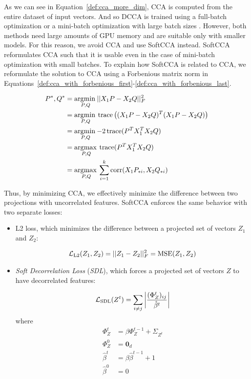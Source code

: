 As we can see in Equation~\ref{def:cca_more_dim}, CCA is computed from the
entire dataset of input vectors. And so DCCA is trained using a full-batch
optimization \citep{andrew2013deep} or a mini-batch optimization with large
batch sizes \citep{wang2015unsupervised}. However, both methods need large
amounts of GPU memory and are suitable only with smaller models. For this
reason, we avoid CCA and use SoftCCA \citep{chang2018scalable} instead. SoftCCA
reformulates CCA such that it is usable even in the case of mini-batch
optimization with small batches. To explain how SoftCCA is related to CCA, we
reformulate the solution to CCA using a Forbenious matrix norm in
Equations~\ref{def:cca_with_forbenious_first}-\ref{def:cca_with_forbenious_last}.

\begin{align}
  P^\ast, Q^\ast &= \underset{P, Q}{\operatorname*{\arg\!\min\medspace}} ||X_1P - X_2Q||^2_F \label{def:cca_with_forbenious_first} \\
  &= \underset{P, Q}{\operatorname*{\arg\!\min\medspace}} \operatorname*{trace}\left((X_1P - X_2Q)^T(X_1P - X_2Q)\right) \\
  &= \underset{P, Q}{\operatorname*{\arg\!\min\medspace}} {-2} \operatorname*{trace}(P^TX_1^TX_2Q) \\
  &= \underset{P, Q}{\operatorname*{\arg\!\max\medspace}} \operatorname*{trace}(P^TX_1^TX_2Q) \\
  &= \underset{P, Q}{\operatorname*{\arg\!\max\medspace}} \sum_{i = 1}^k \operatorname*{corr}(X_1P_{*i}, X_2Q_{*i}) \label{def:cca_with_forbenious_last}
\end{align}

Thus, by minimizing CCA, we effectively minimize the difference between two
projections with uncorrelated features. SoftCCA enforces the same behavior
with two separate losses:

\begin{itemize}

  \item L2 loss, which minimizes the difference between a projected set of
    vectors $Z_1$ and $Z_2$:

    \begin{equation}
      \mathcal{L}_{\text{L2}}(Z_1, Z_2) = ||Z_1 - Z_2||^2_F = \operatorname*{MSE}(Z_1, Z_2)
    \end{equation}

  \item \emph{Soft Decorrelation Loss} (\emph{SDL}), which forces a projected
    set of vectors $Z$ to have decorrelated features:

    \begin{equation}
      \mathcal{L}_{\text{SDL}}(Z^t) = \sum_{i \ne j} \left|
          \frac{(\Phi^t_Z)_{ij}}{\hat{\beta}^t}
          \right|
    \end{equation}
    where
    \begin{align}
      \Phi^t_Z &= \beta \Phi^{t-1}_Z + \Sigma_{Z^t} \\
      \Phi^0_Z &= \bm{0}_d \\
      \hat{\beta}^t &= \beta \hat{\beta}^{t-1} + 1 \\
      \hat{\beta}^0 &= 0
    \end{align}

\end{itemize}


